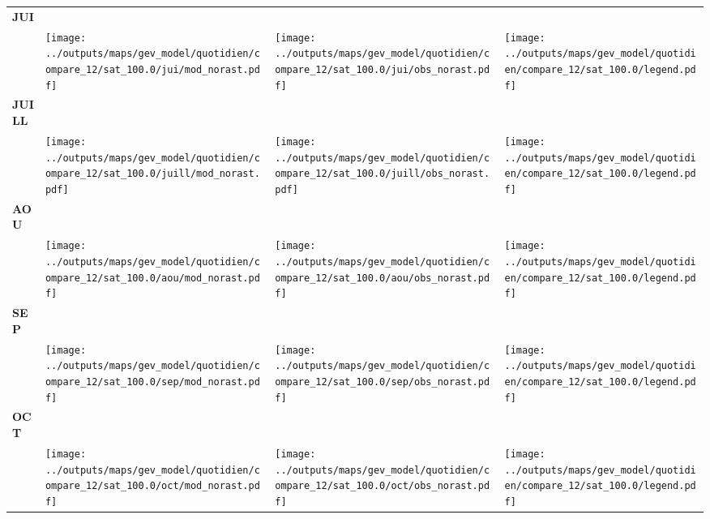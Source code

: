 \documentclass[
  letterpaper,
  DIV=11,
  numbers=noendperiod]{scrartcl}
\begin{document}
\begin{longtable*}{m{2.0cm}m{7.9cm}m{7.9cm}m{1cm}}
\centering \textbf{JUI} \\[0.2em] \begin{tabular}{r@{\hspace{0.2em}}l}\end{tabular} & \centering \texttt{[image: ../outputs/maps/gev\_model/quotidien/compare\_12/sat\_100.0/jui/mod\_norast.pdf]} & \centering \texttt{[image: ../outputs/maps/gev\_model/quotidien/compare\_12/sat\_100.0/jui/obs\_norast.pdf]} & \centering \texttt{[image: ../outputs/maps/gev\_model/quotidien/compare\_12/sat\_100.0/legend.pdf]} \tabularnewline
\centering \textbf{JUILL} \\[0.2em] \begin{tabular}{r@{\hspace{0.2em}}l}\end{tabular} & \centering \texttt{[image: ../outputs/maps/gev\_model/quotidien/compare\_12/sat\_100.0/juill/mod\_norast.pdf]} & \centering \texttt{[image: ../outputs/maps/gev\_model/quotidien/compare\_12/sat\_100.0/juill/obs\_norast.pdf]} & \centering \texttt{[image: ../outputs/maps/gev\_model/quotidien/compare\_12/sat\_100.0/legend.pdf]} \tabularnewline
\centering \textbf{AOU} \\[0.2em] \begin{tabular}{r@{\hspace{0.2em}}l}\end{tabular} & \centering \texttt{[image: ../outputs/maps/gev\_model/quotidien/compare\_12/sat\_100.0/aou/mod\_norast.pdf]} & \centering \texttt{[image: ../outputs/maps/gev\_model/quotidien/compare\_12/sat\_100.0/aou/obs\_norast.pdf]} & \centering \texttt{[image: ../outputs/maps/gev\_model/quotidien/compare\_12/sat\_100.0/legend.pdf]} \tabularnewline
\centering \textbf{SEP} \\[0.2em] \begin{tabular}{r@{\hspace{0.2em}}l}\end{tabular} & \centering \texttt{[image: ../outputs/maps/gev\_model/quotidien/compare\_12/sat\_100.0/sep/mod\_norast.pdf]} & \centering \texttt{[image: ../outputs/maps/gev\_model/quotidien/compare\_12/sat\_100.0/sep/obs\_norast.pdf]} & \centering \texttt{[image: ../outputs/maps/gev\_model/quotidien/compare\_12/sat\_100.0/legend.pdf]} \tabularnewline
\centering \textbf{OCT} \\[0.2em] \begin{tabular}{r@{\hspace{0.2em}}l}\end{tabular} & \centering \texttt{[image: ../outputs/maps/gev\_model/quotidien/compare\_12/sat\_100.0/oct/mod\_norast.pdf]} & \centering \texttt{[image: ../outputs/maps/gev\_model/quotidien/compare\_12/sat\_100.0/oct/obs\_norast.pdf]} & \centering \texttt{[image: ../outputs/maps/gev\_model/quotidien/compare\_12/sat\_100.0/legend.pdf]} \tabularnewline

\end{longtable*}
\end{document}

